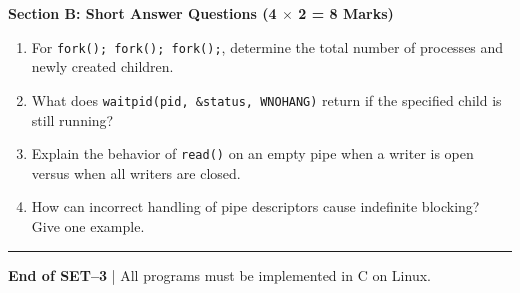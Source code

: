 \documentclass[9pt,a4paper]{extarticle}
\begin{document}
\begin{minipage}[t][0.47\textheight][t]{\textwidth}
\vspace{1mm}
\textbf{Section B: Short Answer Questions (4 $\times$ 2 = 8 Marks)}

\begin{enumerate}[
label=\textbf{Q\arabic*.},
leftmargin=6mm,
itemsep=2pt,
topsep=2pt
]

\item For \texttt{fork(); fork(); fork();}, determine
the total number of processes and newly created children.

\item What does \texttt{waitpid(pid, \&status, WNOHANG)}
return if the specified child is still running?

\item Explain the behavior of \texttt{read()} on an empty
pipe when a writer is open versus when all writers are closed.

\item How can incorrect handling of pipe descriptors cause
indefinite blocking? Give one example.

\end{enumerate}

\vfill
\hrule
\begin{center}
{\scriptsize\textbf{End of SET--3}
\quad | \quad All programs must be implemented in C on Linux.}
\end{center}

\end{minipage}
\end{document}
